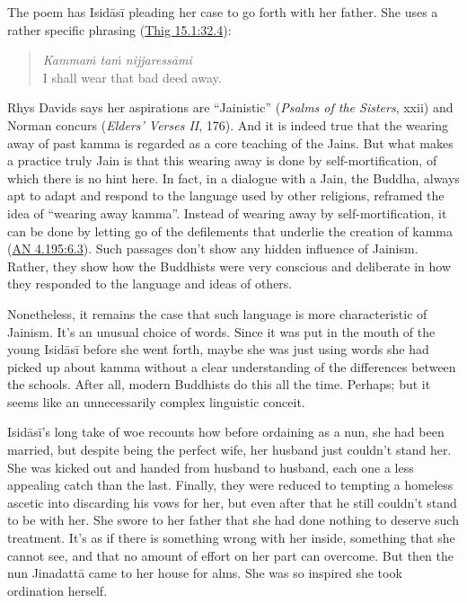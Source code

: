 \documentclass[12pt,openany]{book}%
\begin{document}
The poem has \textsanskrit{Isidāsī} pleading her case to go forth with her father. She uses a rather specific phrasing (\href{https://suttacentral.net/thig15.1/en/sujato\#32.4}{Thig 15.1:32.4}):

\begin{verse}%
\textit{\textsanskrit{Kammaṁ} \textsanskrit{taṁ} \textsanskrit{nijjaressāmi}} \\
I shall wear that bad deed away.

%
\end{verse}

Rhys Davids says her aspirations are “Jainistic” (\textit{Psalms of the Sisters}, xxii) and Norman concurs (\textit{Elders’ Verses II}, 176). And it is indeed true that the wearing away of past kamma is regarded as a core teaching of the Jains. But what makes a practice truly Jain is that this wearing away is done by self-mortification, of which there is no hint here. In fact, in a dialogue with a Jain, the Buddha, always apt to adapt and respond to the language used by other religions, reframed the idea of “wearing away kamma”. Instead of wearing away by self-mortification, it can be done by letting go of the defilements that underlie the creation of kamma (\href{https://suttacentral.net/an4.195/en/sujato\#6.3}{AN 4.195:6.3}). Such passages don’t show any hidden influence of Jainism. Rather, they show how the Buddhists were very conscious and deliberate in how they responded to the language and ideas of others.

Nonetheless, it remains the case that such language is more characteristic of Jainism. It’s an unusual choice of words. Since it was put in the mouth of the young \textsanskrit{Isidāsī} before she went forth, maybe she was just using words she had picked up about kamma without a clear understanding of the differences between the schools. After all, modern Buddhists do this all the time. Perhaps; but it seems like an unnecessarily complex linguistic conceit.

\textsanskrit{Isidāsī}’s long take of woe recounts how before ordaining as a nun, she had been married, but despite being the perfect wife, her husband just couldn’t stand her. She was kicked out and handed from husband to husband, each one a less appealing catch than the last. Finally, they were reduced to tempting a homeless ascetic into discarding his vows for her, but even after that he still couldn’t stand to be with her. She swore to her father that she had done nothing to deserve such treatment. It’s as if there is something wrong with her inside, something that she cannot see, and that no amount of effort on her part can overcome. But then the nun \textsanskrit{Jinadattā} came to her house for alms. She was so inspired she took ordination herself.
\end{document}
